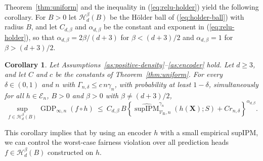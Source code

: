 \documentclass{article} %
\newtheorem{corollary}[theorem]{Corollary}
\begin{document}
Theorem~\ref{thm:uniform} and the inequality in (\ref{eq:relu-holder}) yield the following corollary.  For $B>0$ let $\mathcal{H}^{\beta}_d(B)$ be the H\"older ball of (\ref{eq:holder-ball}) with radius $B$, and let $C_{d,\beta}$ and $\alpha_{d,\beta}$ be the constant and exponent in (\ref{eq:relu-holder}), so that $\alpha_{d,\beta}=2\beta/(d+3)$ for $\beta<(d+3)/2$ and $\alpha_{d,\beta}=1$ for $\beta>(d+3)/2$.
\begin{corollary}
\label{cor:certificate}
Let Assumptions~\ref{as:positive-density}--\ref{as:encoder} hold. Let $d\ge3$, and let $C$ and $c$ be the constants of Theorem~\ref{thm:uniform}.  For every $\delta\in(0,1)$ and  $n$ with $\Gamma_{n,\delta}\le c\,n\gamma_n$, with probability at least $1-\delta$, simultaneously for all  $h\in\mathcal{E}_n$,  $B>0$ and  $\beta>0$ with $\beta\ne(d+3)/2$,
\begin{equation}
  \sup_{f\in\mathcal{H}^{\beta}_d(B)}
  \operatorname{GDP}_{\infty,n}(f\circ h)
  \ \le\ C_{d,\beta}\,B
  \left\{\widehat{\operatorname{supIPM}}^{\gamma_n}_{\mathcal{V}_{\mathrm{R}},n}(h(\mathbf{X});S)+Cr_{n,\delta}\right\}^{\alpha_{d,\beta}} .
  \label{eq:certificate}
\end{equation}
\end{corollary}
This corollary implies that by using an encoder $h$ with a small empirical supIPM, 
we can control the worst-case fairness violation over all prediction heads $f\in\mathcal{H}^{\beta}_d(B)$
constructed on $h$.


\end{document}
